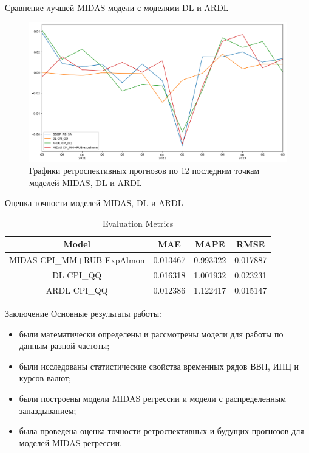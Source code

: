 \documentclass[notheorems, 10pt]{beamer}
\begin{document}
\begin{frame}
	{Сравнение лучшей MIDAS модели с моделями DL и ARDL}
	\begin{figure}
		\centering
		\includegraphics[scale=0.35]{../TeX/images/img09}
		\caption{Графики ретроспективных прогнозов по 12 последним точкам моделей MIDAS, DL и ARDL}
		\label{fig:img09}
	\end{figure}
	
\end{frame}


\begin{frame}
	{Оценка точности моделей MIDAS, DL и ARDL}
	\begin{table}[htbp]
		\centering
		\caption{Evaluation Metrics}
		\label{tab:evaluation_metrics}
		\begin{tabular}{|c|c|c|c|}
			\hline
			Model & MAE & MAPE & RMSE \\
			\hline
			MIDAS CPI\_MM+RUB ExpAlmon & 0.013467 & 0.993322 & 0.017887 \\
			DL CPI\_QQ                 & 0.016318 & 1.001932 & 0.023231 \\
			ARDL CPI\_QQ               & 0.012386 & 1.122417 & 0.015147 \\
			\hline
		\end{tabular}
	\end{table}
\end{frame}


\begin{frame}
	{Заключение}
	Основные результаты работы:
	\begin{itemize}
		\item были математически определены и рассмотрены модели для работы по данным разной частоты;
		\item были исследованы статистические свойства временных рядов ВВП, ИПЦ и курсов валют;
		\item были построены модели MIDAS регрессии и модели с распределенным запаздыванием;
		\item была проведена оценка точности ретроспективных и будущих прогнозов для моделей MIDAS регрессии.
	\end{itemize} 
\end{frame}
\end{document}
